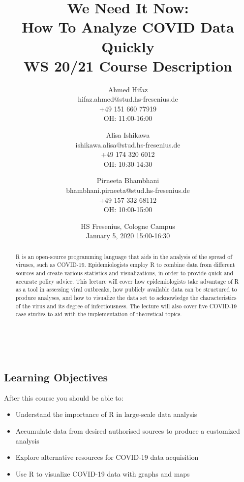 \documentclass{article}
\begin{document}
\title{We Need It Now: \\
How To Analyze COVID Data Quickly\\
\vspace{3mm}
\normalsize WS 20/21 Course Description}\\
\author{Ahmed Hifaz \\
	\small hifaz.ahmed@stud.hs-fresenius.de \\
	\small +49 151 660 77919 \\
	\small OH: 11:00-16:00 \\
	\and 
	Alisa Ishikawa \\
	\small ishikawa.alisa@stud.hs-fresenius.de \\
	\small +49 174 320 6012 \\
	\small OH: 10:30-14:30 \\
	\and 
	Pirneeta Bhambhani \\
	\small bhambhani.pirneeta@stud.hs-fresenius.de \\
	\small +49 157 332 68112 \\
	\small OH: 10:00-15:00 \\
}
\date{HS Fresenius, Cologne Campus \\
        January 5, 2020 15:00-16:30}

\maketitle
	
\begin{abstract}
\noindent
R is an open-source programming language that aids in the analysis of the spread of viruses, such as COVID-19. Epidemiologists employ R to combine data from different sources and create various statistics and visualizations, in order to provide quick and accurate policy advice. This lecture will cover how epidemiologists take advantage of R as a tool in assessing viral outbreaks, how publicly available data can be structured to produce analyses, and how to visualize the data set to acknowledge the characteristics of the virus and its degree of infectiousness. The lecture will also cover five COVID-19 case studies to aid with the implementation of theoretical topics.
\end{abstract}
\subsection*{Learning Objectives}
	After this course you should be able to:\label{book}
\begin{itemize}
	\item Understand the importance of R in large-scale data analysis
    \item Accumulate data from desired authorised sources to produce a customized analysis
    \item Explore alternative resources for COVID-19 data acquisition
    \item Use R to visualize COVID-19 data with graphs and maps
\end{itemize}
\end{document}
